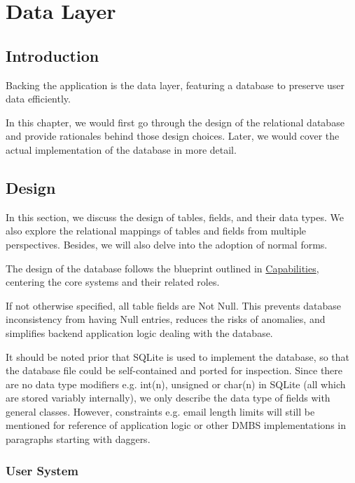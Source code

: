 \chapter{Data Layer}
\label{data-layer}

\section{Introduction}
\label{data-layer.intro}

Backing the application is the data layer, featuring a database to preserve user
data efficiently.

In this chapter, we would first go through the design of the relational database
and provide rationales behind those design choices. Later, we would cover the actual
implementation of the database in more detail.

\section{Design}
\label{data-layer.design}

In this section, we discuss the design of tables, fields, and their data types.
We also explore the relational mappings of tables and fields from multiple
perspectives. Besides, we will also delve into the adoption of normal forms.

The design of the database follows the blueprint outlined in
\hyperref[overview.capab]{Capabilities}, centering the core systems and their related
roles.

If not otherwise specified, all table fields are Not Null. This prevents database
inconsistency from having Null entries, reduces the risks of anomalies, and simplifies
backend application logic dealing with the database.

It should be noted prior that SQLite is used to implement the database, so that
the database file could be self-contained and ported for inspection. Since there
are no data type modifiers e.g. int(n), unsigned or char(n) in SQLite (all which
are stored variably internally), we only describe the data type of fields with
general classes. However, constraints e.g. email length limits will still be mentioned
for reference of application logic or other DMBS implementations in paragraphs starting
with daggers.

\subsection{User System}
\label{data-layer.design.user}

